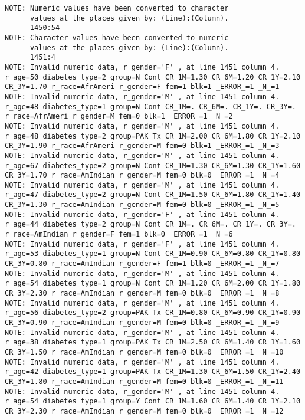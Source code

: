 \documentclass{article}\usepackage[]{graphicx}\usepackage[]{color}
\begin{document}
\begin{verbatim}
NOTE: Numeric values have been converted to character
      values at the places given by: (Line):(Column).
      1450:54
NOTE: Character values have been converted to numeric
      values at the places given by: (Line):(Column).
      1451:4
NOTE: Invalid numeric data, r_gender='F' , at line 1451 column 4.
r_age=50 diabetes_type=2 group=N Cont CR_1M=1.30 CR_6M=1.20 CR_1Y=2.10
CR_3Y=1.70 r_race=AfrAmeri r_gender=F fem=1 blk=1 _ERROR_=1 _N_=1
NOTE: Invalid numeric data, r_gender='M' , at line 1451 column 4.
r_age=48 diabetes_type=1 group=N Cont CR_1M=. CR_6M=. CR_1Y=. CR_3Y=.
r_race=AfrAmeri r_gender=M fem=0 blk=1 _ERROR_=1 _N_=2
NOTE: Invalid numeric data, r_gender='M' , at line 1451 column 4.
r_age=48 diabetes_type=2 group=PAK Tx CR_1M=2.00 CR_6M=1.80 CR_1Y=2.10
CR_3Y=1.90 r_race=AfrAmeri r_gender=M fem=0 blk=1 _ERROR_=1 _N_=3
NOTE: Invalid numeric data, r_gender='M' , at line 1451 column 4.
r_age=67 diabetes_type=2 group=N Cont CR_1M=1.30 CR_6M=1.30 CR_1Y=1.60
CR_3Y=1.70 r_race=AmIndian r_gender=M fem=0 blk=0 _ERROR_=1 _N_=4
NOTE: Invalid numeric data, r_gender='M' , at line 1451 column 4.
r_age=47 diabetes_type=2 group=N Cont CR_1M=1.50 CR_6M=1.80 CR_1Y=1.40
CR_3Y=1.30 r_race=AmIndian r_gender=M fem=0 blk=0 _ERROR_=1 _N_=5
NOTE: Invalid numeric data, r_gender='F' , at line 1451 column 4.
r_age=44 diabetes_type=2 group=N Cont CR_1M=. CR_6M=. CR_1Y=. CR_3Y=.
r_race=AmIndian r_gender=F fem=1 blk=0 _ERROR_=1 _N_=6
NOTE: Invalid numeric data, r_gender='F' , at line 1451 column 4.
r_age=53 diabetes_type=1 group=N Cont CR_1M=0.90 CR_6M=0.80 CR_1Y=0.80
CR_3Y=0.80 r_race=AmIndian r_gender=F fem=1 blk=0 _ERROR_=1 _N_=7
NOTE: Invalid numeric data, r_gender='M' , at line 1451 column 4.
r_age=54 diabetes_type=1 group=N Cont CR_1M=1.20 CR_6M=2.00 CR_1Y=1.80
CR_3Y=2.30 r_race=AmIndian r_gender=M fem=0 blk=0 _ERROR_=1 _N_=8
NOTE: Invalid numeric data, r_gender='M' , at line 1451 column 4.
r_age=56 diabetes_type=2 group=PAK Tx CR_1M=0.80 CR_6M=0.90 CR_1Y=0.90
CR_3Y=0.90 r_race=AmIndian r_gender=M fem=0 blk=0 _ERROR_=1 _N_=9
NOTE: Invalid numeric data, r_gender='M' , at line 1451 column 4.
r_age=38 diabetes_type=1 group=PAK Tx CR_1M=2.50 CR_6M=1.40 CR_1Y=1.60
CR_3Y=1.50 r_race=AmIndian r_gender=M fem=0 blk=0 _ERROR_=1 _N_=10
NOTE: Invalid numeric data, r_gender='M' , at line 1451 column 4.
r_age=42 diabetes_type=1 group=PAK Tx CR_1M=1.30 CR_6M=1.50 CR_1Y=2.40
CR_3Y=1.80 r_race=AmIndian r_gender=M fem=0 blk=0 _ERROR_=1 _N_=11
NOTE: Invalid numeric data, r_gender='M' , at line 1451 column 4.
r_age=54 diabetes_type=1 group=Y Cont CR_1M=1.60 CR_6M=1.40 CR_1Y=2.10
CR_3Y=2.30 r_race=AmIndian r_gender=M fem=0 blk=0 _ERROR_=1 _N_=12

\end{verbatim}
\end{document}
